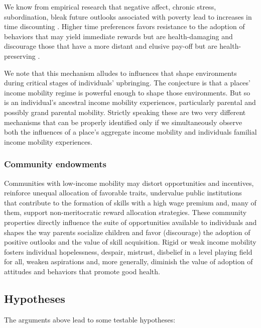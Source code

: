\documentclass[11pt]{article}
\begin{document}
We know from empirical research that negative affect, chronic stress, subordination, bleak future outlooks associated with poverty lead to increases in time discounting \citep{Haushofer2014}. Higher time preferences favors resistance to the adoption of behaviors that may yield immediate rewards but are health-damaging and discourage those that have a more distant and elusive pay-off but are health-preserving \citep{Schlam2013,Eigsti2006}.

We note that this mechanism alludes to influences that shape environments during critical stages of individuals' upbringing. The conjecture is that a places' income mobility regime is powerful enough to shape those environments. But so is an individual's ancestral income mobility experiences, particularly parental and possibly grand parental mobility. Strictly speaking these are two very different mechanisms that can be properly identified only if we simultaneously observe both the influences of a place's aggregate income mobility and individuals familial income mobility experiences.

\subsubsection{Community endowments}

Communities with low-income mobility may distort opportunities and incentives, reinforce unequal allocation of favorable traits, undervalue public institutions that contribute to the formation of skills with a high wage premium and, many of them, support non-meritocratic reward allocation strategies. These community properties directly influence the suite of opportunities available to individuals and shapes the way parents socialize children and favor (discourage) the adoption of positive outlooks and the value of skill acquisition. Rigid or weak income mobility fosters individual hopelessness, despair, mistrust, disbelief in a level playing field for all, weaken aspirations and, more generally, diminish the value of adoption of attitudes and behaviors that promote good health.

\subsection{Hypotheses}

The arguments above lead to some testable hypotheses:
\end{document}
